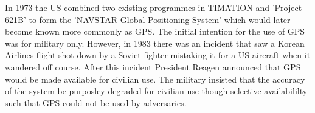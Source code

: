 In 1973 the US combined two existing programmes in TIMATION and 'Project 621B' to form the 'NAVSTAR Global Positioning System' which would later become known more
commonly as GPS. The initial intention for the use of GPS was for military only. However, in 1983 there was an incident that saw a Korean Airlines flight shot down by
a Soviet fighter mistaking it for a US aircraft when it wandered off course. After this incident President Reagen announced that GPS would be made available for civilian
use. The military insisted that the accuracy of the system be purposley degraded for civilian use though selective availabililty such that GPS could not be used by
adversaries. 


